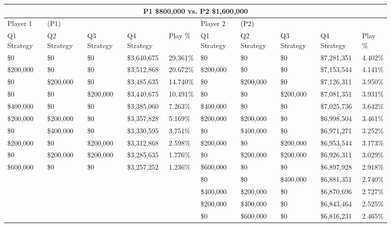 \documentclass[11pt]{article}
\begin{document}
\begin{figure}
\tiny
\begin{tabular}{ |p{1.0cm}p{1.0cm}p{1.0cm}p{2.0cm}|p{1.0cm}||p{1.0cm}p{1.0cm}p{1.0cm}p{2.0cm}|p{1.0cm}|}
\hline
\multicolumn{10}{|c|}{P1 \$800,000 vs. P2 \$1,600,000} \\
\hline
Player 1 & (P1) & & & & Player 2 & (P2) & & & \\
\hline
Q1 Strategy & Q2 Strategy & Q3 Strategy & Q4 Strategy  &  Play \% & Q1 Strategy & Q2 Strategy & Q3 Strategy & Q4 Strategy  &  Play \%\\
\hline
\$0 & \$0 & \$0 & \$3,640,675  & 29.361\%           & \$0 & \$0 & \$0 & \$7,281,351  & 4.402\% \\
\$200,000 & \$0 & \$0 & \$3,512,868  & 20.672\%     & \$200,000 & \$0 & \$0 & \$7,153,544  & 4.141\% \\
\$0& \$200,000 & \$0 & \$3,485,635  & 14.740\%      & \$0& \$200,000 & \$0 & \$7,126,311  & 3.950\% \\
\$0 & \$0& \$200,000 & \$3,440,675  & 10.491\%      & \$0 & \$0& \$200,000 & \$7,081,351  & 3.931\% \\
\$400,000 & \$0 & \$0 & \$3,385,060  & 7.263\%      & \$400,000 & \$0 & \$0 & \$7,025,736  & 3.642\% \\
\$200,000& \$200,000 & \$0 & \$3,357,828  & 5.169\% & \$200,000& \$200,000 & \$0 & \$6,998,504  & 3.461\% \\
\$0& \$400,000 & \$0 & \$3,330,595  & 3.751\%       & \$0& \$400,000 & \$0 & \$6,971,271  & 3.252\% \\
\$200,000 & \$0& \$200,000 & \$3,312,868  & 2.598\% & \$200,000 & \$0& \$200,000 & \$6,953,544 & 3.173\% \\
\$0& \$200,000& \$200,000 & \$3,285,635  & 1.776\%  & \$0& \$200,000& \$200,000 & \$6,926,311  & 3.029\% \\
\$600,000 & \$0 & \$0& \$3,257,252  & 1.236\%       & \$600,000 & \$0 & \$0 & \$6,897,928  & 2.918\% \\
&&&&                                                & \$0 & \$0& \$400,000 & \$6,881,351  & 2.740\% \\
&&&&                                                & \$400,000& \$200,000 & \$0 & \$6,870,696  & 2.727\% \\
&&&&                                                & \$200,000& \$400,000 & \$0 & \$6,843,464  & 2.525\% \\
&&&&                                                & \$0 & \$600,000 & \$0 & \$6,816,231  & 2.465\% \\

\end{tabular}
\end{figure}
\end{document}
